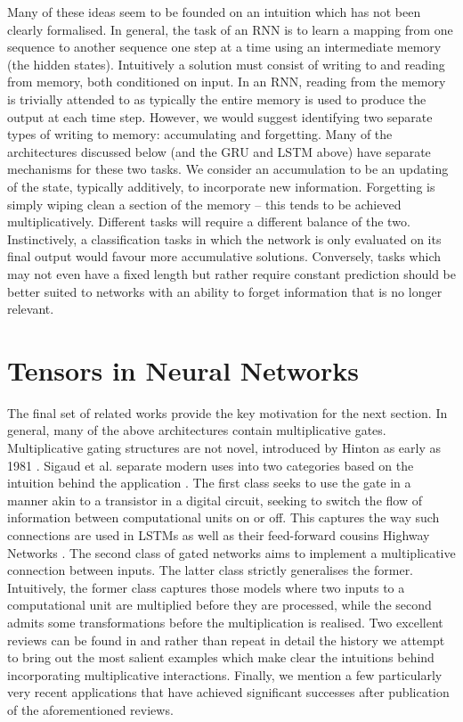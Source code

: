 Many of these ideas seem to be founded on an intuition which has not been clearly formalised. In
general, the task of an RNN is to learn a mapping from one sequence to another sequence one step at
a time using an intermediate memory (the hidden states). Intuitively a solution must consist of
writing to and reading from memory, both conditioned on input. In an RNN, reading from the memory is
trivially attended to as typically the entire memory is used to produce the output at each time
step. However, we would suggest identifying two separate types of writing to memory: accumulating
and forgetting. Many of the architectures discussed below (and the GRU and LSTM above) have separate
mechanisms for these two tasks. 
We consider an accumulation to be an updating of the state, typically additively, to incorporate
new information. Forgetting is simply wiping clean a section of the memory -- this tends to be
achieved multiplicatively. Different tasks will require a different balance of the two. Instinctively,
a classification tasks in which the network is only evaluated on its final output would favour
more accumulative solutions. Conversely, tasks which may not even have a fixed length but rather
require constant prediction should be better suited to networks with an ability to forget information
that is no longer relevant.

\section{Tensors in Neural Networks}
The final set of related works provide the key motivation for the next section. In general, many of
the above architectures contain multiplicative gates. Multiplicative gating structures are not novel,
introduced by Hinton as early as 1981 \autocite{Hinton1981}. Sigaud et al. separate modern uses into
two categories based on the intuition behind the application \autocite{Sigaud2015}. The first class
seeks to use the gate in a manner akin to a transistor in a digital circuit, seeking to switch the
flow of information between computational units on or off. This captures the way such connections are
used in LSTMs as well as their feed-forward cousins Highway Networks \autocite{Srivastava2015}. The
second class of gated networks aims to implement a multiplicative connection between inputs. The
latter class strictly generalises the former. Intuitively, the former class captures those models
where two inputs to a computational unit are multiplied before they are processed, while the second
admits some transformations before the multiplication is realised. Two excellent reviews can be
found in \autocite{Memisevic2011, Sigaud2015} and rather than repeat in detail the history we
attempt to bring out the most salient examples which make clear the intuitions behind incorporating
multiplicative interactions. Finally, we mention a few particularly very recent applications
that have achieved significant successes after publication of the aforementioned reviews.

